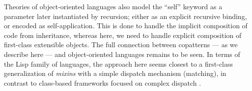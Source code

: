 Theories of object-oriented languages \cite{abadi96,CookP94} also model the ``self'' keyword as a parameter later instantiated by recursion; either as an explicit recursive binding, or encoded as self-application.
This is done to handle the implicit composition of code from inheritance, whereas here, we need to handle explicit composition of first-class extensible objects.
The full connection between copatterns --- as we describe here --- and object-oriented languages remains to be seen.
In terms of the Lisp family of languages, the approach here seems closest to a first-class generalization of \emph{mixins} \cite{BrachaC90Mixins,flatt1998mixin} with a simple dispatch mechanism (matching), in contrast to class-based frameworks focused on complex dispatch \cite{CLOS,Ingalls86,chambers1992}.


